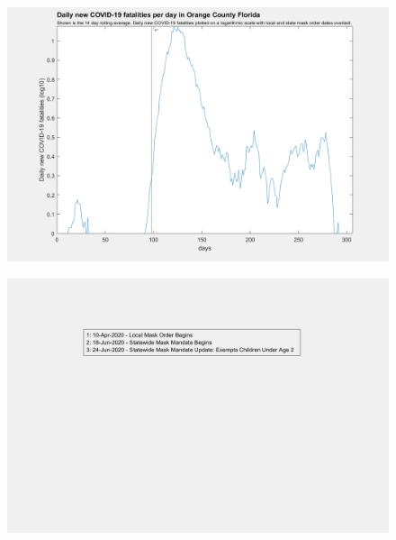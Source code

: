 \documentclass[]{article}
\begin{document}
\begin{figure}[!h]
	\includegraphics[width=\linewidth]{images/orange_mask_order_fatalities_log.png}
	\caption{}
	\label{fig:images/orange_mask_order_fatalities_logLabel}
\end{figure}

\begin{figure}[!h]
	\includegraphics[width=\linewidth]{legends/los_angeles_mask_order_legend.png}
	\caption{}
	\label{fig:legends/los_angeles_mask_order_legendLabel}
\end{figure}
\end{document}
